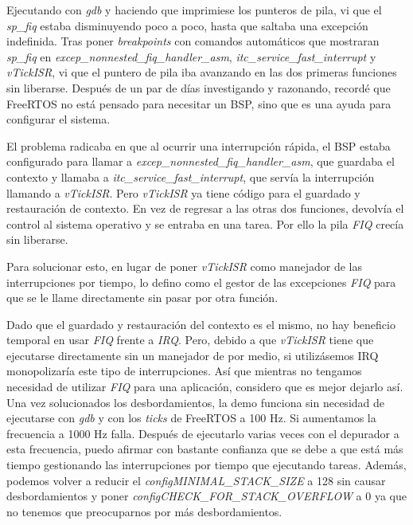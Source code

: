 Ejecutando con \emph{gdb} y haciendo que imprimiese los punteros de pila, vi que el \emph{sp\_fiq} estaba disminuyendo poco a poco, hasta que saltaba una excepción indefinida. Tras poner \emph{breakpoints} con comandos automáticos que mostraran \emph{sp\_fiq}
en \emph{excep\_nonnested\_fiq\_handler\_asm}, \emph{itc\_service\_fast\_interrupt} y \emph{vTickISR}, vi que el puntero de pila iba avanzando en las dos primeras funciones sin liberarse. Después de un par de días investigando y razonando, recordé que FreeRTOS no está pensado para necesitar un BSP, sino que es una ayuda para configurar el sistema.

El problema radicaba en que al ocurrir una interrupción rápida, el BSP estaba configurado para llamar a \emph{excep\_nonnested\_fiq\_handler\_asm}, que guardaba el contexto y llamaba a \emph{itc\_service\_fast\_interrupt}, que servía la interrupción llamando a \emph{vTickISR}. Pero \emph{vTickISR} ya tiene código para el guardado y restauración de contexto. En vez de regresar a las otras dos funciones, devolvía el control al sistema operativo y se entraba en una tarea. Por ello la pila \emph{FIQ} crecía sin liberarse.

Para solucionar esto, en lugar de poner \emph{vTickISR} como manejador de las interrupciones por tiempo, lo defino como el gestor de las excepciones \emph{FIQ} para que se le llame directamente sin pasar por otra función.

Dado que el guardado y restauración del contexto es el mismo, no hay beneficio temporal en usar \emph{FIQ} frente a \emph{IRQ}. Pero, debido a que \emph{vTickISR} tiene que ejecutarse directamente sin un manejador de por medio, si utilizásemos IRQ monopolizaría este tipo de interrupciones. Así que mientras no tengamos necesidad de utilizar \emph{FIQ} para una aplicación, considero que es mejor dejarlo así.\\

Una vez solucionados los desbordamientos, la demo funciona sin necesidad de ejecutarse con \emph{gdb} y con los \emph{ticks} de FreeRTOS a 100 Hz. Si aumentamos la frecuencia a 1000 Hz falla. Después de ejecutarlo varias veces con el depurador a esta frecuencia, puedo afirmar con bastante confianza que se debe a que está más tiempo gestionando las interrupciones por tiempo que ejecutando tareas. Además, podemos volver a reducir el \emph{configMINIMAL\_STACK\_SIZE} a 128 sin causar desbordamientos y poner \emph{configCHECK\_FOR\_STACK\_OVERFLOW} a 0 ya que no tenemos que preocuparnos por más desbordamientos.




